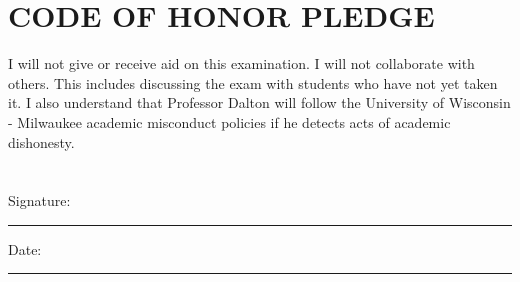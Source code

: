\documentclass[12pt,letterpaper]{article}
\begin{document}
\section*{CODE OF HONOR PLEDGE}

I will not give or receive aid on this examination. I will not collaborate with others. This includes discussing the exam with students who have not yet taken it. I also understand that Professor Dalton will follow the University of Wisconsin - Milwaukee academic misconduct policies if he detects acts of academic dishonesty.
\\\\\\
Signature:\rule{8cm}{0.4pt} Date:\rule{4cm}{0.4pt}
\end{document}
